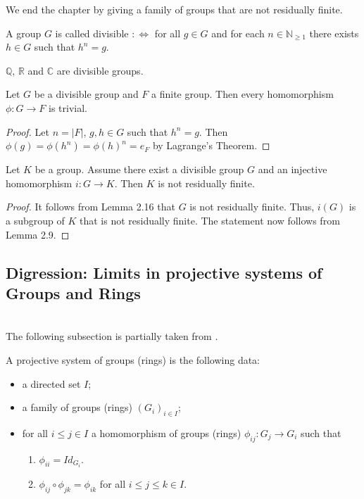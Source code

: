 We end the chapter by giving a family of groups that are not residually finite.

\begin{definition}
A group $G$ is called divisible $: \Leftrightarrow$ for all $g \in G$ and for each $n \in \mathbb{N}_{\geq 1}$ there exists $h \in G$ such that $h^n = g$.
\end{definition}

\begin{example}
$\mathbb{Q}$, $\mathbb{R}$ and $\mathbb{C}$ are divisible groups.
\end{example}

\begin{lemma}
Let $G$ be a divisible group and $F$ a finite group. Then every homomorphism $\phi: G \rightarrow F$ is trivial.
\end{lemma}

\begin{proof}
Let $n = |F|$, $g, h \in G$ such that $h^n = g$. Then $\phi(g) = \phi(h^n) = \phi(h)^n = e_F$ by Lagrange's Theorem.
\end{proof}

\begin{corollary}
Let $K$ be a group. Assume there exist a divisible group $G$ and an injective homomorphism $i: G \rightarrow K$. Then $K$ is not residually finite.
\end{corollary}

\begin{proof}
It follows from Lemma 2.16 that $G$ is not residually finite. Thus, $i(G)$ is a subgroup of $K$ that is not residually finite. The statement now follows from Lemma 2.9.
\end{proof}

\subsection{Digression: Limits in projective systems of Groups and Rings} \hfill\\

The following subsection is partially taken from \cite[pages 380/381]{silberstein}.

\begin{definition}
A projective system of groups (rings) is the following data:
\begin{itemize}
\item a directed set $I$;
\item a family of groups (rings) $(G_i)_{i \in I}$;
\item for all $ i \leq j \in I$ a homomorphism of groups (rings) $\phi_{ij}: G_j \rightarrow G_i$ such that \begin{enumerate}
\item $\phi_{ii} = Id_{G_i}$.
\item $\phi_{ij} \circ \phi_{jk} = \phi_{ik}$ for all $i \leq j \leq k \in I$.
\end{enumerate}
\end{itemize}
\end{definition}

